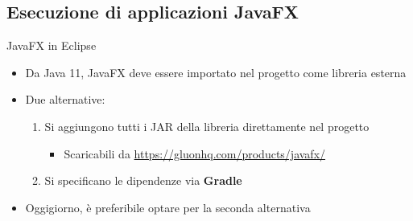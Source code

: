 \documentclass[presentation]{beamer}
\begin{document}
\subsection{Esecuzione di applicazioni JavaFX}

\begin{frame}{JavaFX in Eclipse}
\begin{itemize}\itemsep10pt
\item Da Java 11, JavaFX deve essere importato nel progetto come libreria esterna
\item Due alternative:
\begin{enumerate}
\item Si aggiungono tutti i JAR della libreria direttamente nel progetto
\begin{itemize}
\item Scaricabili da \url{https://gluonhq.com/products/javafx/}
\end{itemize}
\item Si specificano le dipendenze via \textbf{Gradle}
\end{enumerate}
\item Oggigiorno, è preferibile optare per la seconda alternativa
\end{itemize}
\end{frame}
\end{document}
